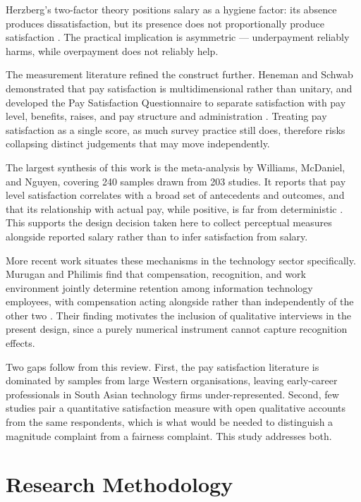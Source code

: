 \documentclass[conference]{IEEEtran}
\begin{document}
Herzberg's two-factor theory positions salary as a hygiene factor: its
absence produces dissatisfaction, but its presence does not
proportionally produce satisfaction \cite{herzberg1959motivation}. The
practical implication is asymmetric --- underpayment reliably harms, while
overpayment does not reliably help.

The measurement literature refined the construct further. Heneman and
Schwab demonstrated that pay satisfaction is multidimensional rather than
unitary, and developed the Pay Satisfaction Questionnaire to separate
satisfaction with pay level, benefits, raises, and pay structure and
administration \cite{heneman1985pay}. Treating pay satisfaction as a
single score, as much survey practice still does, therefore risks
collapsing distinct judgements that may move independently.

The largest synthesis of this work is the meta-analysis by Williams,
McDaniel, and Nguyen, covering 240 samples drawn from 203 studies. It
reports that pay level satisfaction correlates with a broad set of
antecedents and outcomes, and that its relationship with actual pay,
while positive, is far from deterministic \cite{williams2006meta}. This
supports the design decision taken here to collect perceptual measures
alongside reported salary rather than to infer satisfaction from salary.

More recent work situates these mechanisms in the technology sector
specifically. Murugan and Philimis find that compensation, recognition,
and work environment jointly determine retention among information
technology employees, with compensation acting alongside rather than
independently of the other two \cite{murugan2025retention}. Their finding
motivates the inclusion of qualitative interviews in the present design,
since a purely numerical instrument cannot capture recognition effects.

Two gaps follow from this review. First, the pay satisfaction literature
is dominated by samples from large Western organisations, leaving
early-career professionals in South Asian technology firms
under-represented. Second, few studies pair a quantitative satisfaction
measure with open qualitative accounts from the same respondents, which
is what would be needed to distinguish a magnitude complaint from a
fairness complaint. This study addresses both.

\section{Research Methodology}
\end{document}
